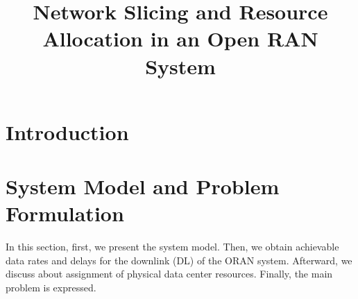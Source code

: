 \documentclass[conference]{IEEEtran}
\begin{document}
\title{Network Slicing and Resource Allocation in an Open RAN System \vspace{-.1cm}
}
%
  \author{
  }

\maketitle

\begin{abstract}

\end{abstract}

\begin{IEEEkeywords}

\end{IEEEkeywords}

\section{Introduction}


\section{System Model and Problem Formulation}\label{systemmodel}

In this section, first, we  present the system model. Then, we obtain achievable data rates and delays for the downlink (DL) of the ORAN system. Afterward, we discuss about assignment of physical data center resources.
Finally, the main problem is expressed.
\end{document}
